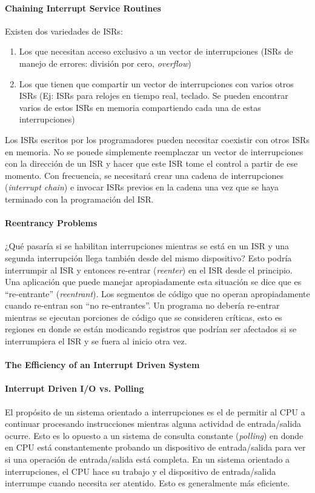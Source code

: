 \paragraph{\textnormal{\textbf{Chaining Interrupt Service Routines}}}
Existen dos variedades de ISRs:
\begin{enumerate}
    \item Los que necesitan acceso exclusivo a un vector de interrupciones (ISRs de manejo de errores: división por cero, \textit{overflow})
    \item Los que tienen que compartir un vector de interrupciones con varios otros ISRs (Ej: ISRs para relojes en tiempo real, teclado. Se pueden encontrar varios de estos ISRs en memoria compartiendo cada una de estas interrupciones)
\end{enumerate}
Los ISRs escritos por los programadores pueden necesitar coexistir con otros ISRs en memoria. No se pouede simplemente reemplaczar un vector de interrupciones con la dirección de un ISR y hacer que este ISR tome el control a partir de ese momento. Con frecuencia, se necesitará crear una cadena de interrupciones (\textit{interrupt chain}) e invocar ISRs previos en la cadena una vez que se haya terminado con la programación del ISR.

\paragraph{\textnormal{\textbf{Reentrancy Problems}}}
¿Qué pasaría si se habilitan interrupciones mientras se está en un ISR y una segunda interrupción llega también desde del mismo dispositivo? Esto podría interrumpir al ISR y entonces re-entrar (\textit{reenter}) en el ISR desde el principio. Una aplicación que puede manejar apropiadamente esta situación se dice que es ``re-entrante'' (\textit{reentrant}). Los segmentos de código que no operan apropiadamente cuando re-entran son ``no re-entrantes''. Un programa no debería re-entrar mientras se ejecutan porciones de código que se consideren críticas, esto es regiones en donde se están modicando registros que podrían ser afectados si se interrumpiera el ISR y se fuera al inicio otra vez.


\paragraph{\textnormal{\textbf{The Efficiency of an Interrupt Driven System}}}

\paragraph{Interrupt Driven I/O vs. Polling}
El propósito de un sistema orientado a interrupciones es el de permitir al CPU a continuar procesando instrucciones mientras alguna actividad de entrada/salida ocurre. Esto es lo opuesto a un sistema de consulta constante (\textit{polling}) en donde en CPU está constantemente probando un dispositivo de entrada/salida para ver si una operación de entrada/salida está completa. En un sistema orientado a interrupciones, el CPU hace su trabajo y el dispositivo de entrada/salida interrumpe cuando necesita ser atentido. Esto es generalmente más eficiente. 


